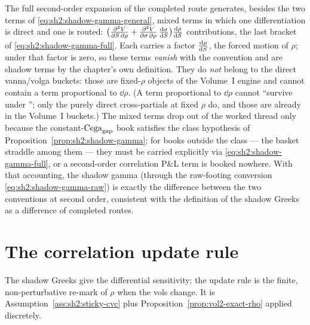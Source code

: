 \begin{remark}
\label{rem:sh2:buckets}
The full second-order expansion of the completed route generates, besides
the two terms of \eqref{eq:sh2:shadow-gamma-general}, mixed terms in which
one differentiation is direct and one is routed:
$\bigl(\frac{\partial^2 V}{\partial S\,\partial \rho} + \frac{\partial^2 V}{\partial \sigma\,\partial \rho}\,\frac{\mathrm{d} \sigma}{\mathrm{d} S}\bigr)
\frac{\mathrm{d} \rho}{\mathrm{d} S}$ contributions, the last bracket of
\eqref{eq:sh2:shadow-gamma-full}. Each carries a factor $\frac{\mathrm{d} \rho}{\mathrm{d} S}$,
the forced motion of $\rho$; under \stickyrho{} that factor is zero, so
these terms \emph{vanish} with the convention and are shadow terms by the
chapter's own definition. They do \emph{not} belong to the direct
vanna/volga buckets: those are fixed-$\rho$ objects of the Volume~I
engine and cannot contain a term proportional to $\dd\rho$. (A term
proportional to $\dd\rho$ cannot ``survive under \stickyrho{}''; only the
purely direct cross-partials at fixed $\rho$ do, and those are already in
the Volume~I buckets.) The mixed terms drop out of the worked thread only
because the constant-$\mathrm{Cega}_{\mathrm{gap}}$ book satisfies the class hypothesis of
Proposition~\ref{prop:sh2:shadow-gamma}; for books outside the class ---
the basket straddle among them --- they must be carried explicitly via
\eqref{eq:sh2:shadow-gamma-full}, or a second-order correlation P\&L term
is booked nowhere. With that accounting, the shadow gamma (through the
raw-footing conversion \eqref{eq:sh2:shadow-gamma-raw}) is exactly the
difference between the two conventions at second order, consistent with
the definition of the shadow Greeks as a difference of completed routes.
\end{remark}

\section{The correlation update rule}\label{sec:sh2:update}

The shadow Greeks give the differential sensitivity; the update rule is the
finite, non-perturbative re-mark of $\rho$ when the vols change. It is
Assumption~\ref{ass:sh2:sticky-cvc} plus
Proposition~\ref{prop:vol2-exact-rho} applied discretely.

